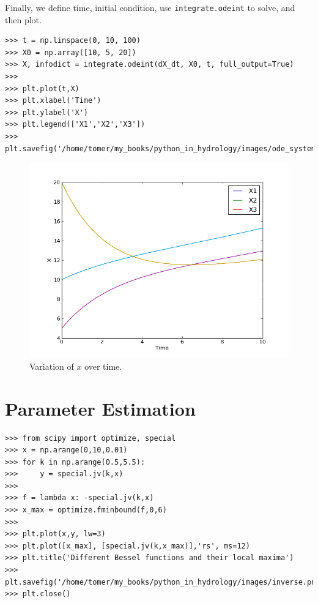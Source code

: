 \documentclass[10pt]{book}
\begin{document}
Finally, we define time, initial condition, use \verb"integrate.odeint" to solve, and then plot. 
\beforeverb \begin{verbatim}     
>>> t = np.linspace(0, 10, 100)    
>>> X0 = np.array([10, 5, 20]) 
>>> X, infodict = integrate.odeint(dX_dt, X0, t, full_output=True)
>>> 
>>> plt.plot(t,X)
>>> plt.xlabel('Time')
>>> plt.ylabel('X')
>>> plt.legend(['X1','X2','X3'])
>>> plt.savefig('/home/tomer/my_books/python_in_hydrology/images/ode_system.png')
\end{verbatim} \afterverb

\beforefig
\begin{figure}[h!]
  \centering
    \includegraphics[scale=0.5]{images/ode_system.png}
  \caption{Variation of $x$ over time.}
   \label{fig:ode}
\end{figure}
\afterfig

\section{Parameter Estimation}
\beforeverb \begin{verbatim}
>>> from scipy import optimize, special
>>> x = np.arange(0,10,0.01)
>>> for k in np.arange(0.5,5.5):
>>>     y = special.jv(k,x)
>>> 
>>> f = lambda x: -special.jv(k,x)
>>> x_max = optimize.fminbound(f,0,6)
>>> 
>>> plt.plot(x,y, lw=3)
>>> plt.plot([x_max], [special.jv(k,x_max)],'rs', ms=12)
>>> plt.title('Different Bessel functions and their local maxima')
>>> plt.savefig('/home/tomer/my_books/python_in_hydrology/images/inverse.png')
>>> plt.close()
\end{verbatim} \afterverb
{}
\end{document}

